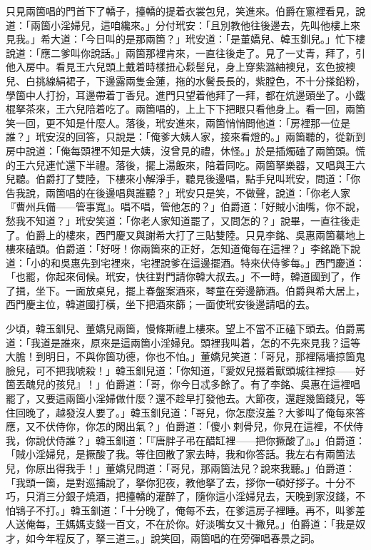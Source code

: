 只見兩箇唱的門首下了轎子，擡轎的提着衣裳包兒，笑進來。伯爵在窻裡看見，說道：「兩箇小淫婦兒，這咱纔來。」分付玳安：「且別教他往後邊去，先叫他樓上來見我。」希大道：「今日叫的是那兩箇？」玳安道：「是董嬌兒、韓玉釧兒。」忙下樓說道：「應二爹叫你說話。」兩箇那裡肯來，一直往後走了。見了一丈青，拜了，引他入房中。看見王六兒頭上戴着時樣扭心鬏髻兒，身上穿紫潞紬襖兒，玄色披襖兒、白挑線絹裙子，下邊露兩隻金蓮，拖的水鬢長長的，紫膛色，不十分搽鉛粉，學箇中人打扮，耳邊帶着丁香兒。進門只望着他拜了一拜，都在炕邊頭坐了。小鐵棍拏茶來，王六兒陪着吃了。兩箇唱的，上上下下把眼只看他身上。看一回，兩箇笑一回，更不知是什麼人。落後，玳安進來，兩箇悄悄問他道：「房裡那一位是誰？」玳安沒的回答，只說是：「俺爹大姨人家，接來看燈的。」兩箇聽的，從新到房中說道：「俺每頭裡不知是大姨，沒曾見的禮，休怪。」於是插燭磕了兩箇頭。慌的王六兒連忙還下半禮。落後，擺上湯飯來，陪着同吃。兩箇拏樂器，又唱與王六兒聽。伯爵打了雙陸，下樓來小解淨手，聽見後邊唱，點手兒叫玳安，{}問道：「你告我說，兩箇唱的在後邊唱與誰聽？」玳安只是笑，不做聲，說道：「你老人家『曹州兵備——管事寬』。唱不唱，管他怎的？」伯爵道：「好賊小油嘴，你不說，愁我不知道？」玳安笑道：「你老人家知道罷了，又問怎的？」說畢，一直往後走了。{}伯爵上的樓來，西門慶又與謝希大打了三貼雙陸。只見李銘、吳惠兩箇驀地上樓來磕頭。伯爵道：「好呀！你兩箇來的正好，怎知道俺每在這裡？」李銘跪下說道：「小的和吳惠先到宅裡來，宅裡說爹在這邊擺酒。特來伏侍爹每。」西門慶道：「也罷，你起來伺候。玳安，快往對門請你韓大叔去。」不一時，韓道國到了，作了揖，坐下。一面放桌兒，擺上春盤案酒來，琴童在旁邊篩酒。伯爵與希大居上，西門慶主位，韓道國打橫，坐下把酒來篩；一面使玳安後邊請唱的去。

少頃，韓玉釧兒、董嬌兒兩箇，慢條斯禮上樓來。望上不當不正磕下頭去。伯爵罵道：「我道是誰來，原來是這兩箇小淫婦兒。頭裡我叫着，怎的不先來見我？這等大膽！到明日，不與你箇功德，你也不怕。」董嬌兒笑道：「哥兒，那裡隔墻掠箇鬼臉兒，可不把我唬殺！」韓玉釧兒道：「你知道，『愛奴兒掇着獸頭城往裡掠——好箇丟醜兒的孩兒』！」伯爵道：「哥，你今日忒多餘了。有了李銘、吳惠在這裡唱罷了，又要這兩箇小淫婦做什麼？還不趁早打發他去。大節夜，還趕幾箇錢兒，等住回晚了，越發沒人要了。」韓玉釧兒道：「哥兒，你怎麼沒羞？大爹叫了俺每來答應，又不伏侍你，你怎的閑出氣？」伯爵道：「傻小𢱉剌骨兒，你見在這裡，不伏侍我，你說伏侍誰？」韓玉釧道：「『唐胖子弔在醋缸裡——把你撅酸了』。」伯爵道：「賊小淫婦兒，是撅酸了我。等住回散了家去時，我和你答話。我左右有兩箇法兒，你原出得我手！」董嬌兒問道：「哥兒，那兩箇法兒？說來我聽。」伯爵道：「我頭一箇，是對巡捕說了，拏你犯夜，教他拏了去，拶你一頓好拶子。十分不巧，只消三分銀子燒酒，把擡轎的灌醉了，隨你這小淫婦兒去，天晚到家沒錢，不怕鴇子不打。」韓玉釧道：「十分晚了，俺每不去，在爹這房子裡睡。再不，叫爹差人送俺每，王媽媽支錢一百文，不在於你。好淡嘴女又十撇兒。」{}伯爵道：「我是奴才，如今年程反了，拏三道三。」說笑回，兩箇唱的在旁彈唱春景之詞。

